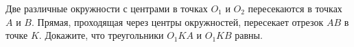 Две различные окружности с центрами в точках $O_1$ и $O_2$ пересекаются в точках $A$ и $B$. Прямая, проходящая через центры окружностей, пересекает отрезок $AB$ в точке $K$. Докажите, что треугольники $O_1KA$ и $O_1KB$ равны.